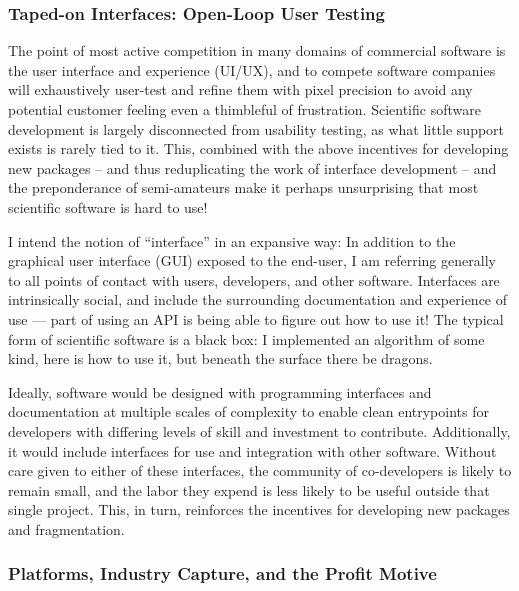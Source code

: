 \documentclass[10pt]{article}
\begin{document}
\begin{multicols}{2}
\hypertarget{taped-on-interfaces-open-loop-user-testing}{%
\subsubsection{Taped-on Interfaces: Open-Loop User
Testing}\label{taped-on-interfaces-open-loop-user-testing}}

The point of most active competition in many domains of commercial
software is the user interface and experience (UI/UX), and to compete
software companies will exhaustively user-test and refine them with
pixel precision to avoid any potential customer feeling even a
thimbleful of frustration. Scientific software development is largely
disconnected from usability testing, as what little support exists is
rarely tied to it. This, combined with the above incentives for
developing new packages -- and thus reduplicating the work of interface
development -- and the preponderance of semi-amateurs make it perhaps
unsurprising that most scientific software is hard to use!

I intend the notion of ``interface'' in an expansive way: In addition to
the graphical user interface (GUI) exposed to the end-user, I am
referring generally to all points of contact with users, developers, and
other software. Interfaces are intrinsically social, and include the
surrounding documentation and experience of use --- part of using an API
is being able to figure out how to use it! The typical form of
scientific software is a black box: I implemented an algorithm of some
kind, here is how to use it, but beneath the surface there be dragons.

Ideally, software would be designed with programming interfaces and
documentation at multiple scales of complexity to enable clean
entrypoints for developers with differing levels of skill and investment
to contribute. Additionally, it would include interfaces for use and
integration with other software. Without care given to either of these
interfaces, the community of co-developers is likely to remain small,
and the labor they expend is less likely to be useful outside that
single project. This, in turn, reinforces the incentives for developing
new packages and fragmentation.

\hypertarget{platforms-industry-capture-and-the-profit-motive}{%
\subsubsection{Platforms, Industry Capture, and the Profit
Motive}\label{platforms-industry-capture-and-the-profit-motive}}


\end{multicols}
\end{document}
